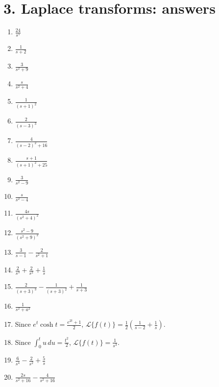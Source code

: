 \documentclass[11pt,a4paper]{article}
\begin{document}
\section*{3. Laplace transforms: answers}
\begin{enumerate}
    \item $\displaystyle \frac{24}{s^5}$
    \item $\displaystyle \frac{1}{s+2}$
    \item $\displaystyle \frac{3}{s^2+9}$
    \item $\displaystyle \frac{s}{s^2+4}$
    \item $\displaystyle \frac{1}{(s+1)^2}$
    \item $\displaystyle \frac{2}{(s-3)^3}$
    \item $\displaystyle \frac{4}{(s-2)^2+16}$
    \item $\displaystyle \frac{s+1}{(s+1)^2+25}$
    \item $\displaystyle \frac{3}{s^2-9}$
    \item $\displaystyle \frac{s}{s^2-4}$
    \item $\displaystyle \frac{4s}{(s^2+4)^2}$
    \item $\displaystyle \frac{s^2-9}{(s^2+9)^2}$
    \item $\displaystyle \frac{3}{s-1}-\frac{2}{s^2+1}$
    \item $\displaystyle \frac{2}{s^3}+\frac{2}{s^2}+\frac{1}{s}$
    \item $\displaystyle \frac{2}{(s+3)^3}-\frac{1}{(s+3)^2}+\frac{1}{s+3}$
    \item $\displaystyle \frac{1}{s^2+a^2}$
    \item Since $e^t\cosh t=\frac{e^{2t}+1}{2}$, \quad $\displaystyle \mathcal{L}\{f(t)\}=\frac{1}{2}\left(\frac{1}{s-2}+\frac{1}{s}\right)$.
    \item Since $\int_0^t u\,du=\frac{t^2}{2}$, \quad $\displaystyle \mathcal{L}\{f(t)\}=\frac{1}{s^3}$.
    \item $\displaystyle \frac{6}{s^4}-\frac{2}{s^2}+\frac{5}{s}$
    \item $\displaystyle \frac{2s}{s^2+16}-\frac{4}{s^2+16}$
\end{enumerate}
\end{document}
